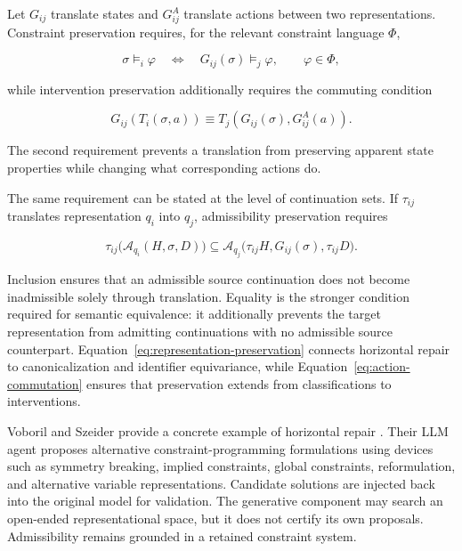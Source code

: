\documentclass[11pt]{article}
\begin{document}
Let $G_{ij}$ translate states and $G^A_{ij}$ translate actions between two representations. Constraint preservation requires, for the relevant constraint language $\Phi$,

\begin{equation}
\sigma\models_i\varphi
\quad\Longleftrightarrow\quad
G_{ij}(\sigma)\models_j\varphi,
\qquad \varphi\in\Phi,
\end{equation}

while intervention preservation additionally requires the commuting condition

\begin{equation}
G_{ij}(T_i(\sigma,a))
\equiv
T_j(G_{ij}(\sigma),G^A_{ij}(a)).
\label{eq:action-commutation}
\end{equation}

The second requirement prevents a translation from preserving apparent state properties while changing what corresponding actions do.

The same requirement can be stated at the level of continuation sets. If $\tau_{ij}$ translates representation $q_i$ into $q_j$, admissibility preservation requires

\begin{equation}
\tau_{ij}\bigl(\mathcal A_{q_i}(H,\sigma,D)\bigr)
\subseteq
\mathcal A_{q_j}
\bigl(\tau_{ij}H,G_{ij}(\sigma),\tau_{ij}D\bigr).
\label{eq:representation-preservation}
\end{equation}

Inclusion ensures that an admissible source continuation does not become inadmissible solely through translation. Equality is the stronger condition required for semantic equivalence: it additionally prevents the target representation from admitting continuations with no admissible source counterpart. Equation~\eqref{eq:representation-preservation} connects horizontal repair to canonicalization and identifier equivariance, while Equation~\eqref{eq:action-commutation} ensures that preservation extends from classifications to interventions.

Voboril and Szeider provide a concrete example of horizontal repair \cite{voboril2026}. Their LLM agent proposes alternative constraint-programming formulations using devices such as symmetry breaking, implied constraints, global constraints, reformulation, and alternative variable representations. Candidate solutions are injected back into the original model for validation. The generative component may search an open-ended representational space, but it does not certify its own proposals. Admissibility remains grounded in a retained constraint system.
\end{document}
